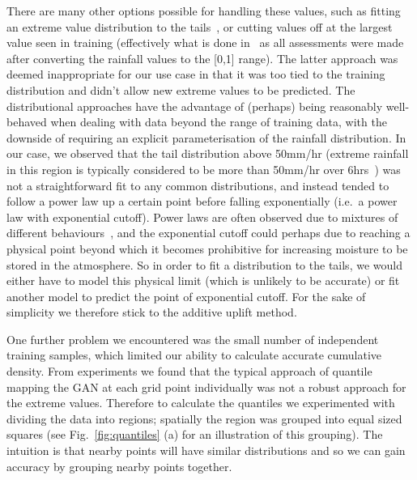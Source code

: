 \documentclass{article}
\begin{document}
There are many other options possible for handling these values, such as fitting an extreme value distribution to the tails~\citep{kallache_nonstationary_2011, trentini_novel_2023}, or cutting values off at the largest value seen in training (effectively what is done in~\cite{leinonen_stochastic_2020} as all assessments were made after converting the rainfall values to the [0,1] range). The latter approach was deemed inappropriate for our use case in that it was too tied to the training distribution and didn't allow new extreme values to be predicted. The distributional approaches have the advantage of (perhaps) being reasonably well-behaved when dealing with data beyond the range of training data, with the downside of requiring an explicit parameterisation of the rainfall distribution. In our case, we observed that the tail distribution above 50mm/hr (extreme rainfall in this region is typically considered to be more than 50mm/hr over 6hrs~\citep{wilson_forecast_2014}) was not a straightforward fit to any common distributions, and instead tended to follow a power law up a certain point before falling exponentially (i.e.~a power law with exponential cutoff). Power laws are often observed due to mixtures of different behaviours~\citep{cavanaugh_probability_2015}, and the exponential cutoff could perhaps due to reaching a physical point beyond which it becomes prohibitive for increasing moisture to be stored in the atmosphere. So in order to fit a distribution to the tails, we would either have to model this physical limit (which is unlikely to be accurate) or fit another model to predict the point of exponential cutoff. For the sake of simplicity we therefore stick to the additive uplift method.

One further problem we encountered was the small number of independent training samples, which limited our ability to calculate accurate cumulative density. From experiments we found that the typical approach of quantile mapping the GAN at each grid point individually was not a robust approach for the extreme values. Therefore to calculate the quantiles we experimented with dividing the data into regions; spatially the region was grouped into equal sized squares (see Fig.~\ref{fig:quantiles} (a) for an illustration of this grouping). The intuition is that nearby points will have similar distributions and so we can gain accuracy by grouping nearby points together. 
\end{document}

